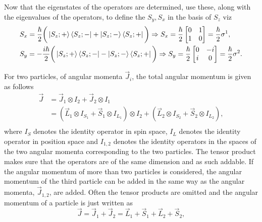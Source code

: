 \begin{example}
\begin{equation}
	\end{equation} 
	Now that the eigenstates of the operators are determined, use these, along with the eigenvalues of the operators, to define the $S_y,S_x$ in the basis of $S_z$ viz
	\begin{equation}
		\begin{split}
			&S_x=\frac{\hbar}{2}\bigg(\ket{S_z;+}\bra{S_z;-}+\ket{S_z;-}\bra{S_z;+}\bigg)\Rightarrow S_x=\frac{\hbar}{2} \begin{bmatrix}
				0 & 1\\
				1 & 0 \\
			\end{bmatrix}=\frac{\hbar}{2}\sigma^1,\\
			&S_y=-\frac{i\hbar}{2}\bigg(\ket{S_z;+}\bra{S_z;-}-\ket{S_z;-}\bra{S_z;+}\bigg)\Rightarrow S_y=\frac{\hbar}{2} \begin{bmatrix}
				0 & -i\\
				i & 0 \\
			\end{bmatrix}=\frac{\hbar}{2}\sigma^2.
		\end{split}
		\label{Sxop}
	\end{equation} 
	
\end{example}
For two particles, of angular momenta $\vec{J}_i$, the total angular momentum is given as follows
\begin{equation}
	\begin{split}
		\vec{J}&=\vec{J}_1\otimes I_{2}+\vec{J}_2\otimes I_1\\
		&=(\vec{L}_1\otimes I_{S_1}+\vec{S}_1\otimes I_{L_1})\otimes I_{2}+(\vec{L}_2\otimes I_{S_2}+\vec{S}_2\otimes I_{L_2}),\\
	\end{split}
\end{equation} 
where $I_S$ denotes the identity operator in spin space, $I_L$ denotes the identity operator in position space and $I_{1,2}$ denotes the identity operators in the spaces of the two angular momenta corresponding to the two particles. The tensor product makes sure that the operators are of the same dimension and as such addable. If the angular momentum of more than two particles is considered, the angular momentum of the third particle can be added in the same way as the angular momenta, $\vec{J}_{1,2}$, are added. Often the tensor products are omitted and the angular momentum of a particle is just written as
\begin{equation}
	\vec{J}=\vec{J}_1+\vec{J}_2=\vec{L}_1+\vec{S}_1+\vec{L}_2+\vec{S}_2,
\end{equation} 
